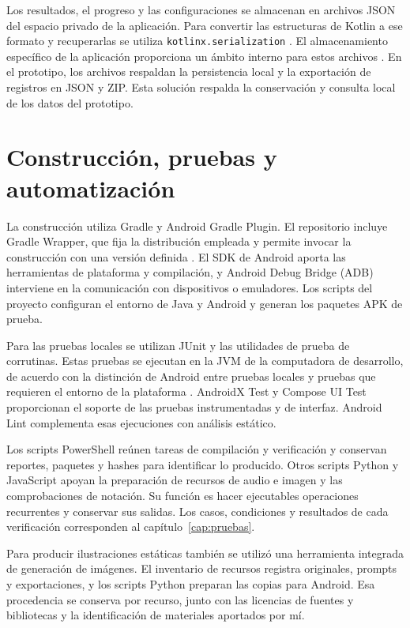 Los resultados, el progreso y las configuraciones se almacenan en archivos JSON
del espacio privado de la aplicación. Para convertir las estructuras de Kotlin
a ese formato y recuperarlas se utiliza \texttt{kotlinx.serialization}
\parencite{kotlinSerializacion}.
El almacenamiento específico de la aplicación proporciona un ámbito interno
para estos archivos \parencite{androidArchivosPrivados}. En el prototipo, los
archivos respaldan la persistencia local y la exportación de registros en JSON
y ZIP. Esta solución respalda la conservación y consulta local de los datos
del prototipo.

\section{Construcción, pruebas y automatización}
\label{sec:herramientas-verificacion}
La construcción utiliza Gradle y Android Gradle Plugin. El repositorio incluye
Gradle Wrapper, que fija la distribución empleada y permite invocar la construcción
con una versión definida \parencite{gradleWrapper}. El SDK de Android aporta las
herramientas de plataforma y compilación, y Android Debug Bridge (ADB) interviene
en la comunicación con dispositivos o emuladores. Los scripts del proyecto
configuran el entorno de Java y Android y generan los paquetes APK de prueba.

Para las pruebas locales se utilizan JUnit y las utilidades de prueba de corrutinas.
Estas pruebas se ejecutan en la JVM de la computadora de desarrollo, de acuerdo
con la distinción de Android entre pruebas locales y pruebas que requieren el
entorno de la plataforma \parencite{androidPruebasLocales}. AndroidX Test y Compose
UI Test proporcionan el soporte de las pruebas instrumentadas y de interfaz.
Android Lint complementa esas ejecuciones con análisis estático.

Los scripts PowerShell reúnen tareas de compilación y verificación y conservan
reportes, paquetes y hashes para identificar lo producido. Otros scripts Python
y JavaScript apoyan la preparación de recursos de audio e imagen y las
comprobaciones de notación. Su función es hacer ejecutables operaciones
recurrentes y conservar sus salidas. Los casos, condiciones y resultados de
cada verificación corresponden al capítulo~\ref{cap:pruebas}.

Para producir ilustraciones estáticas también se utilizó una herramienta integrada
de generación de imágenes. El inventario de recursos registra originales,
prompts y exportaciones, y los scripts Python preparan las copias para Android.
Esa procedencia se conserva por recurso, junto con las licencias de fuentes y
bibliotecas y la identificación de materiales aportados por mí.

